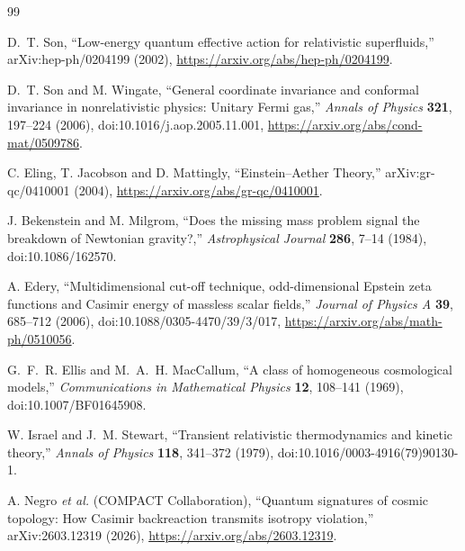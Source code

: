 \begin{thebibliography}{99}

D.~T. Son,
``Low-energy quantum effective action for relativistic superfluids,''
arXiv:hep-ph/0204199 (2002),
\url{https://arxiv.org/abs/hep-ph/0204199}.

D.~T. Son and M. Wingate,
``General coordinate invariance and conformal invariance in nonrelativistic
physics: Unitary Fermi gas,''
\emph{Annals of Physics} \textbf{321}, 197--224 (2006),
doi:10.1016/j.aop.2005.11.001,
\url{https://arxiv.org/abs/cond-mat/0509786}.

C. Eling, T. Jacobson and D. Mattingly,
``Einstein--Aether Theory,''
arXiv:gr-qc/0410001 (2004),
\url{https://arxiv.org/abs/gr-qc/0410001}.

J. Bekenstein and M. Milgrom,
``Does the missing mass problem signal the breakdown of Newtonian gravity?,''
\emph{Astrophysical Journal} \textbf{286}, 7--14 (1984),
doi:10.1086/162570.

A. Edery,
``Multidimensional cut-off technique, odd-dimensional Epstein zeta functions
and Casimir energy of massless scalar fields,''
\emph{Journal of Physics A} \textbf{39}, 685--712 (2006),
doi:10.1088/0305-4470/39/3/017,
\url{https://arxiv.org/abs/math-ph/0510056}.

G.~F.~R. Ellis and M.~A.~H. MacCallum,
``A class of homogeneous cosmological models,''
\emph{Communications in Mathematical Physics} \textbf{12}, 108--141 (1969),
doi:10.1007/BF01645908.

W. Israel and J.~M. Stewart,
``Transient relativistic thermodynamics and kinetic theory,''
\emph{Annals of Physics} \textbf{118}, 341--372 (1979),
doi:10.1016/0003-4916(79)90130-1.

A. Negro \emph{et al.} (COMPACT Collaboration),
``Quantum signatures of cosmic topology: How Casimir backreaction transmits
isotropy violation,'' arXiv:2603.12319 (2026),
\url{https://arxiv.org/abs/2603.12319}.

\end{thebibliography}
